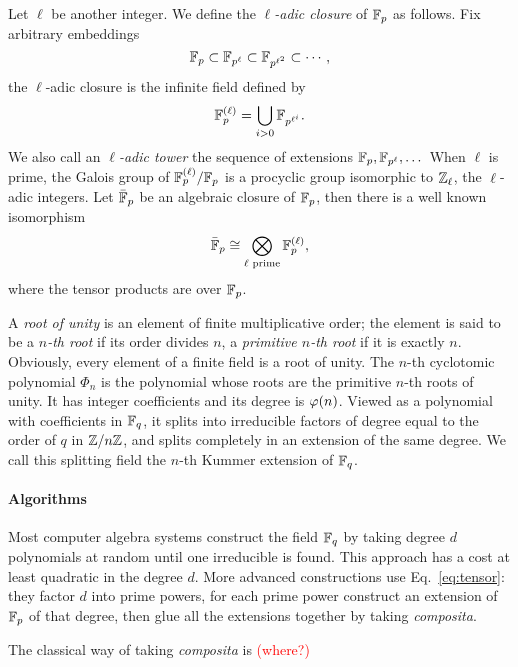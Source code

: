 \documentclass{sig-alternate}
\newcommand{\todo}[1]{\textcolor{red}{(#1)}}
\newcommand{\Cyc}{\Phi}  %
\begin{document}
Let $\ell$ be another integer. We define the \emph{$\ell$-adic
  closure} of $\mathbb{F}_p$ as follows. Fix arbitrary embeddings
\begin{equation*}
  \mathbb{F}_p \subset \mathbb{F}_{p^\ell} \subset \mathbb{F}_{p^{\ell^2}} \subset \cdots,
\end{equation*}
the $\ell$-adic closure is the infinite field defined by
\begin{equation*}
  \mathbb{F}_p^{(\ell)} = \bigcup_{i>0}\mathbb{F}_{p^{\ell^i}}.
\end{equation*}
We also call an \emph{$\ell$-adic tower} the sequence of extensions
$\mathbb{F}_p,\mathbb{F}_{p^\ell},\dots$ When $\ell$ is prime, the Galois group of
$\mathbb{F}_p^{(\ell)}/\mathbb{F}_p$ is a procyclic group isomorphic to $\mathbb{Z}_\ell$, the
$\ell$-adic integers. Let $\bar{\mathbb{F}}_p$ be an algebraic closure of
$\mathbb{F}_p$, then there is a well known isomorphism
\begin{equation}
  \label{eq:tensor}
  \bar{\mathbb{F}}_p \cong \bigotimes_{\ell\text{ prime}} \mathbb{F}_p^{(\ell)},
\end{equation}
where the tensor products are over $\mathbb{F}_p$.

A \emph{root of unity} is an element of finite multiplicative order;
the element is said to be a \emph{$n$-th root} if its order divides
$n$, a \emph{primitive $n$-th root} if it is exactly $n$. Obviously,
every element of a finite field is a root of unity. The $n$-th
cyclotomic polynomial $\Cyc_n$ is the polynomial whose roots are the
primitive $n$-th roots of unity. It has integer coefficients and its
degree is $\varphi(n)$. Viewed as a polynomial with coefficients in $\mathbb{F}_q$,
it splits into irreducible factors of degree equal to the order of $q$
in $\mathbb{Z}/n\mathbb{Z}$, and splits completely in an extension of the same
degree. We call this splitting field the $n$-th Kummer extension of
$\mathbb{F}_q$.

\paragraph{Algorithms}
Most computer algebra systems construct the field $\mathbb{F}_q$ by taking
degree $d$ polynomials at random until one irreducible is found. This
approach has a cost at least quadratic in the degree $d$. More
advanced constructions use Eq.~\eqref{eq:tensor}: they factor $d$ into
prime powers, for each prime power construct an extension of $\mathbb{F}_p$ of
that degree, then glue all the extensions together by taking
\emph{composita}.

The classical way of taking \emph{composita} is \todo{where?}
\end{document}
